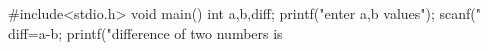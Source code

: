 #include<stdio.h>
void main()
{
    int a,b,diff;
    printf("enter a,b values");
    scanf("%
    diff=a-b;
    printf("\n difference of two numbers is%
}